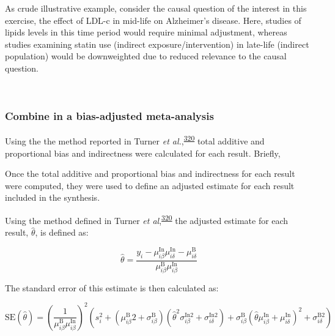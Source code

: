\documentclass[a4paper, twoside]{templates/ociamthesis}
\begin{document}
As crude illustrative example, consider the causal question of the interest in this exercise, the effect of LDL-c in mid-life on Alzheimer's disease. Here, studies of lipids levels in this time period would require minimal adjustment, whereas studies examining statin use (indirect exposure/intervention) in late-life (indirect population) would be downweighted due to reduced relevance to the causal question.

~

\hypertarget{combine-in-a-bias-adjusted-meta-analysis}{%
\subsubsection{Combine in a bias-adjusted meta-analysis}\label{combine-in-a-bias-adjusted-meta-analysis}}

Using the the method reported in Turner \emph{et al.},\textsuperscript{\protect\hyperlink{ref-turner2009}{320}} total additive and proportional bias and indirectness were calculated for each result. Briefly,

Once the total additive and proportional bias and indirectness for each result were computed, they were used to define an adjusted estimate for each result included in the synthesis.

Using the method defined in Turner \emph{et al},\textsuperscript{\protect\hyperlink{ref-turner2009}{320}} the adjusted estimate for each result, \(\hat\theta\), is defined as:

\begin{equation}
  \hat{\theta} = \frac{y_i - \mu_{i\beta}^{\mathrm{In}}\mu_{i\delta}^{\mathrm{In}} - \mu_{i\delta}^{\mathrm{B}}}{\mu_{i\beta}^{\mathrm{B}}\mu_{i\beta}^{\mathrm{In}}}
  \label{eq:adjusted-mean}
\end{equation}

The standard error of this estimate is then calculated as:

\begin{equation}
  \mathrm{SE}(\hat{\theta})=\left(\frac{1}{\mu_{i \beta}^{\mathrm{B}} \mu_{i \beta}^{\mathrm{In}}}\right)^{2}\left(s_{i}^{2}+\left(\mu_{i \beta}^{\mathrm{B}} 2+\sigma_{i \beta}^{\mathrm{B}}\right)\left(\hat{\theta}^{2} \sigma_{i \beta}^{\mathrm{In} 2}+\sigma_{i \delta}^{\mathrm{In} 2}\right)+\sigma_{i \beta}^{\mathrm{B}}\left(\hat{\theta} \mu_{i \beta}^{\mathrm{In}}+\mu_{i \delta}^{\mathrm{In}}\right)^{2}+\sigma_{i \delta}^{\mathrm{B} 2}\right)
  \label{eq:adjusted-se}
\end{equation}
\end{document}
